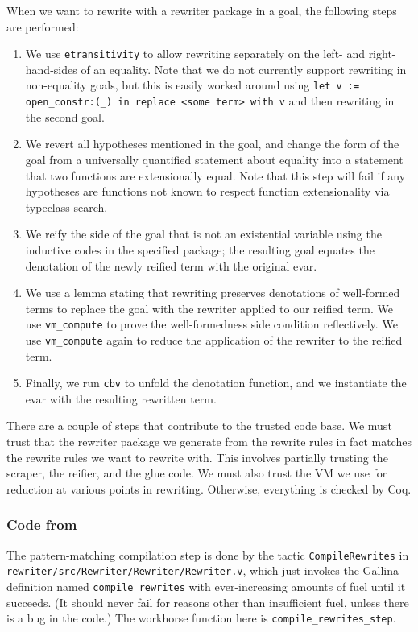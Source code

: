\documentclass[a4paper,USenglish,cleveref,autoref,thm-restate]{lipics-v2021}
\newcommand{\tacvmcompute}{\texttt{vm_compute}}
\newcommand{\taccbv}{\texttt{cbv}}
\begin{document}
When we want to rewrite with a rewriter package in a goal, the following steps are performed:
\begin{enumerate}
    \item
    We use \texttt{etransitivity} to allow rewriting separately on the left- and right-hand-sides of an equality.
    Note that we do not currently support rewriting in non-equality goals, but this is easily worked around using \texttt{let v := open\_constr:(\_) in replace <some term> with v} and then rewriting in the second goal.
    \item
    We revert all hypotheses mentioned in the goal, and change the form of the goal from a universally quantified statement about equality into a statement that two functions are extensionally equal.
    Note that this step will fail if any hypotheses are functions not known to respect function extensionality via typeclass search.
    \item
    We reify the side of the goal that is not an existential variable using the inductive codes in the specified package; the resulting goal equates the denotation of the newly reified term with the original evar.
    \item
    We use a lemma stating that rewriting preserves denotations of well-formed terms to replace the goal with the rewriter applied to our reified term.
    We use \tacvmcompute{} to prove the well-formedness side condition reflectively.
    We use \tacvmcompute{} again to reduce the application of the rewriter to the reified term.
    \item
    Finally, we run \taccbv{} to unfold the denotation function, and we instantiate the evar with the resulting rewritten term.
\end{enumerate}

There are a couple of steps that contribute to the trusted code base.
We must trust that the rewriter package we generate from the rewrite rules in fact matches the rewrite rules we want to rewrite with.
This involves partially trusting the scraper, the reifier, and the glue code.
We must also trust the VM we use for reduction at various points in rewriting.
Otherwise, everything is checked by Coq.

\subsubsection{Code from }

The pattern-matching compilation step is done by the tactic \texttt{CompileRewrites} in \texttt{rewriter/src/Rewriter/Rewriter/Rewriter.v}, which just invokes the Gallina definition named \texttt{compile\_rewrites} with ever-increasing amounts of fuel until it succeeds.
(It should never fail for reasons other than insufficient fuel, unless there is a bug in the code.)
The workhorse function here is \texttt{compile\_rewrites\_step}.
\end{document}
